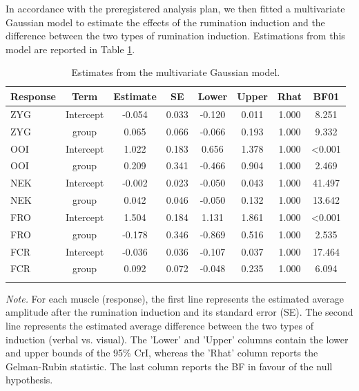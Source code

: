 \documentclass[a4paper,12pt,twoside,openright,oldfontcommands,final]{memoir}
\begin{document}
In accordance with the preregistered analysis plan, we then fitted a multivariate Gaussian model to estimate the effects of the rumination induction and the difference between the two types of rumination induction. Estimations from this model are reported in Table \ref{tab:outputbmod1}.

\begin{table}[H]
\begin{center}
\begin{threeparttable}
\caption{\label{tab:outputbmod1}Estimates from the multivariate Gaussian model.}
\small{
\begin{tabular}{lccccccc}
\toprule
Response & \multicolumn{1}{c}{Term} & \multicolumn{1}{c}{Estimate} & \multicolumn{1}{c}{SE} & \multicolumn{1}{c}{Lower} & \multicolumn{1}{c}{Upper} & \multicolumn{1}{c}{Rhat} & \multicolumn{1}{c}{BF01}\\
\midrule
ZYG & Intercept & -0.054 & 0.033 & -0.120 & 0.011 & 1.000 & 8.251\\
ZYG & group & 0.065 & 0.066 & -0.066 & 0.193 & 1.000 & 9.332\\
OOI & Intercept & 1.022 & 0.183 & 0.656 & 1.378 & 1.000 & <0.001\\
OOI & group & 0.209 & 0.341 & -0.466 & 0.904 & 1.000 & 2.469\\
NEK & Intercept & -0.002 & 0.023 & -0.050 & 0.043 & 1.000 & 41.497\\
NEK & group & 0.042 & 0.046 & -0.050 & 0.132 & 1.000 & 13.642\\
FRO & Intercept & 1.504 & 0.184 & 1.131 & 1.861 & 1.000 & <0.001\\
FRO & group & -0.178 & 0.346 & -0.869 & 0.516 & 1.000 & 2.535\\
FCR & Intercept & -0.036 & 0.036 & -0.107 & 0.037 & 1.000 & 17.464\\
FCR & group & 0.092 & 0.072 & -0.048 & 0.235 & 1.000 & 6.094\\
\bottomrule
\addlinespace
\end{tabular}
}
\begin{tablenotes}[para]
\textit{Note.} For each muscle (response), the first line represents the estimated average
amplitude after the rumination induction and its standard error (SE). The second line
represents the estimated average difference between the two types of induction (verbal vs. visual). The 'Lower' and 'Upper' columns contain the lower and upper bounds of the 95\% CrI, whereas the 'Rhat' column reports the Gelman-Rubin statistic. The last column reports the BF in favour of the null hypothesis.
\end{tablenotes}
\end{threeparttable}
\end{center}
\end{table}
\end{document}
